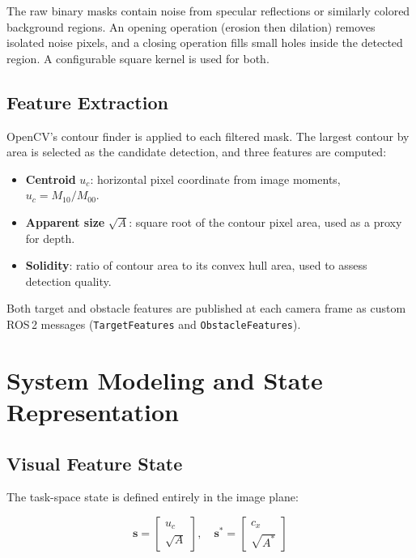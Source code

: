 \documentclass[journal, 10pt]{IEEEtran}
\begin{document}
The raw binary masks contain noise from specular reflections or similarly
colored background regions. An opening operation (erosion then dilation)
removes isolated noise pixels, and a closing operation fills small holes
inside the detected region. A configurable square kernel is used for both.

\subsection{Feature Extraction}

OpenCV's contour finder is applied to each filtered mask. The largest
contour by area is selected as the candidate detection, and three features
are computed:

\begin{itemize}
  \item \textbf{Centroid} $u_c$: horizontal pixel coordinate from image
    moments, $u_c = M_{10}/M_{00}$.
  \item \textbf{Apparent size} $\sqrt{A}$: square root of the contour pixel
    area, used as a proxy for depth.
  \item \textbf{Solidity}: ratio of contour area to its convex hull area,
    used to assess detection quality.
\end{itemize}

Both target and obstacle features are published at each camera frame as
custom ROS\,2 messages (\texttt{TargetFeatures} and
\texttt{ObstacleFeatures}).

\section{System Modeling and State Representation}
\label{sec:model}

\subsection{Visual Feature State}

The task-space state is defined entirely in the image plane:

\begin{equation}
  \mathbf{s} = \begin{bmatrix} u_c \\ \sqrt{A} \end{bmatrix}, \quad
  \mathbf{s}^* = \begin{bmatrix} c_x \\ \sqrt{A^*} \end{bmatrix}
  \label{eq:state}
\end{equation}
\end{document}
